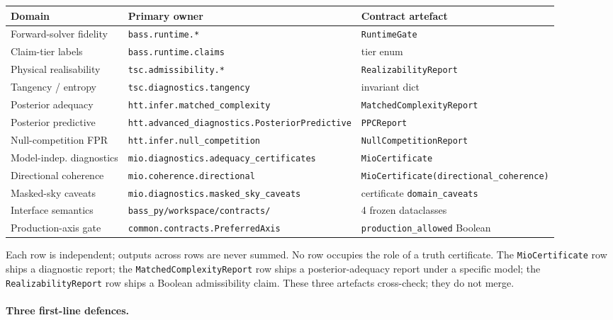 \begin{center}
\setlength{\tabcolsep}{4pt}
\small
\begin{tabular}{lll}
\hline\hline
Domain & Primary owner & Contract artefact \\
\hline
Forward-solver fidelity
  & \texttt{bass.runtime.*}
  & \texttt{RuntimeGate} \\
Claim-tier labels
  & \texttt{bass.runtime.claims}
  & tier enum \\
Physical realisability
  & \texttt{tsc.admissibility.*}
  & \texttt{RealizabilityReport} \\
Tangency / entropy
  & \texttt{tsc.diagnostics.tangency}
  & invariant dict \\
Posterior adequacy
  & \texttt{htt.infer.matched\_complexity}
  & \texttt{MatchedComplexityReport} \\
Posterior predictive
  & \texttt{htt.advanced\_diagnostics.PosteriorPredictive}
  & \texttt{PPCReport} \\
Null-competition FPR
  & \texttt{htt.infer.null\_competition}
  & \texttt{NullCompetitionReport} \\
Model-indep. diagnostics
  & \texttt{mio.diagnostics.adequacy\_certificates}
  & \texttt{MioCertificate} \\
Directional coherence
  & \texttt{mio.coherence.directional}
  & \texttt{MioCertificate(directional\_coherence)} \\
Masked-sky caveats
  & \texttt{mio.diagnostics.masked\_sky\_caveats}
  & certificate \texttt{domain\_caveats} \\
Interface semantics
  & \texttt{bass\_py/workspace/contracts/}
  & 4 frozen dataclasses \\
Production-axis gate
  & \texttt{common.contracts.PreferredAxis}
  & \texttt{production\_allowed} Boolean \\
\hline\hline
\end{tabular}
\end{center}

Each row is independent; outputs across rows are never
summed.  No row occupies the role of a truth certificate.
The \texttt{MioCertificate} row ships a diagnostic report;
the \texttt{MatchedComplexityReport} row ships a
posterior-adequacy report under a specific model; the
\texttt{RealizabilityReport} row ships a Boolean
admissibility claim.  These three artefacts cross-check;
they do not merge.


\paragraph{Three first-line defences.}

